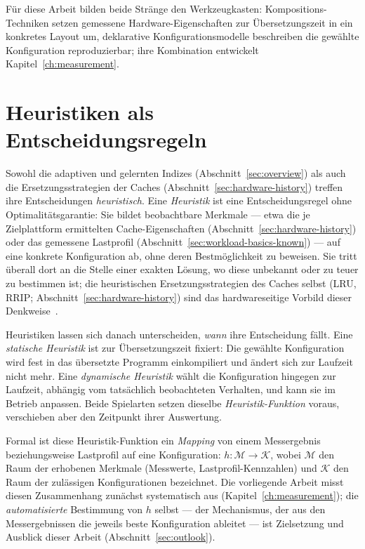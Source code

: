 \begin{nurkurz}
Für diese Arbeit bilden beide Stränge den Werkzeugkasten: Kompositions-Techniken setzen gemessene
Hardware-Eigenschaften zur Übersetzungszeit in ein konkretes Layout um, deklarative Konfigurationsmodelle beschreiben
die gewählte Konfiguration reproduzierbar; ihre Kombination entwickelt Kapitel~\ref{ch:measurement}.
\end{nurkurz}

\section{Heuristiken als Entscheidungsregeln}\label{sec:heuristics-basics}
Sowohl die adaptiven und gelernten Indizes (Abschnitt~\ref{sec:overview}) als auch die
Ersetzungsstrategien der Caches (Abschnitt~\ref{sec:hardware-history}) treffen ihre Entscheidungen
\emph{heuristisch}. Eine \emph{Heuristik} ist eine Entscheidungsregel ohne Optimalitätsgarantie: Sie
bildet beobachtbare Merkmale --- etwa die je Zielplattform ermittelten Cache-Eigenschaften
(Abschnitt~\ref{sec:hardware-history}) oder das gemessene Lastprofil
(Abschnitt~\ref{sec:workload-basics-known}) --- auf eine konkrete Konfiguration ab, ohne deren
Bestmöglichkeit zu beweisen. Sie tritt überall dort an die Stelle einer exakten Lösung, wo diese
unbekannt oder zu teuer zu bestimmen ist; die heuristischen Ersetzungsstrategien des Caches selbst (LRU,
RRIP\@; Abschnitt~\ref{sec:hardware-history}) sind das hardwareseitige Vorbild dieser
Denkweise~\cite{jaleel2010rrip}.

Heuristiken lassen sich danach unterscheiden, \emph{wann} ihre Entscheidung fällt. Eine
\emph{statische Heuristik} ist zur Übersetzungszeit fixiert: Die gewählte Konfiguration wird fest in das
übersetzte Programm einkompiliert und ändert sich zur Laufzeit nicht mehr. Eine \emph{dynamische
Heuristik} wählt die Konfiguration hingegen zur Laufzeit, abhängig vom tatsächlich beobachteten
Verhalten, und kann sie im Betrieb anpassen. Beide Spielarten setzen dieselbe \emph{Heuristik-Funktion}
voraus, verschieben aber den Zeitpunkt ihrer Auswertung.

\begin{nurlang}
Formal ist diese Heuristik-Funktion ein \emph{Mapping} von einem Messergebnis beziehungsweise
Lastprofil auf eine Konfiguration: $h: \mathcal{M} \rightarrow \mathcal{K}$, wobei $\mathcal{M}$ den
Raum der erhobenen Merkmale (Messwerte, Lastprofil-Kennzahlen) und $\mathcal{K}$ den Raum der
zulässigen Konfigurationen bezeichnet. Die vorliegende Arbeit misst diesen Zusammenhang zunächst
systematisch aus (Kapitel~\ref{ch:measurement}); die \emph{automatisierte} Bestimmung von $h$ selbst ---
der Mechanismus, der aus den Messergebnissen die jeweils beste Konfiguration ableitet --- ist
Zielsetzung und Ausblick dieser Arbeit (Abschnitt~\ref{sec:outlook}).
\end{nurlang}

